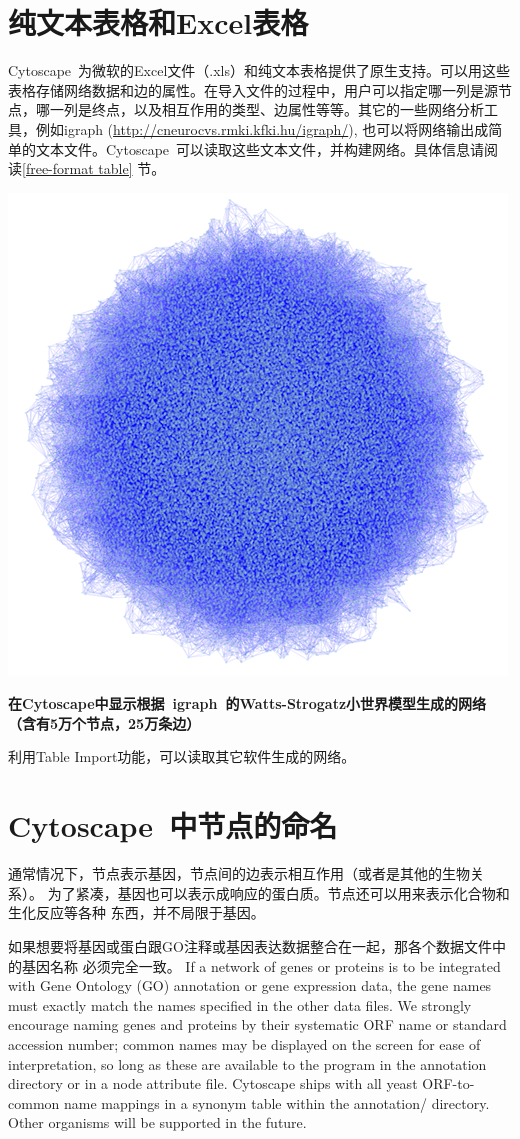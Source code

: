 \section{纯文本表格和Excel表格}

Cytoscape~为微软的Excel文件（.xls）和纯文本表格提供了原生支持。可以用这些表格存储网络数据和边的属性。在导入文件的过程中，用户可以指定哪一列是源节点，哪一列是终点，以及相互作用的类型、边属性等等。其它的一些网络分析工具，例如igraph (\url{http://cneurocvs.rmki.kfki.hu/igraph/}), 也可以将网络输出成简单的文本文件。Cytoscape~可以读取这些文本文件，并构建网络。具体信息请阅读\ref{free-format table} 节。

\centerline{\includegraphics[width=.7\textwidth]{images/huge_network_igraph.png}}

\textbf{在Cytoscape中显示根据~igraph~的Watts-Strogatz小世界模型生成的网络（含有5万个节点，25万条边）}
 
利用Table Import功能，可以读取其它软件生成的网络。
 
\section{Cytoscape~中节点的命名}

通常情况下，节点表示基因，节点间的边表示相互作用（或者是其他的生物关系）。
为了紧凑，基因也可以表示成响应的蛋白质。节点还可以用来表示化合物和生化反应等各种
东西，并不局限于基因。

如果想要将基因或蛋白跟GO注释或基因表达数据整合在一起，那各个数据文件中的基因名称
必须完全一致。
If a network of genes or proteins is to be integrated with Gene Ontology (GO)
annotation or gene expression data, the gene names must exactly match the names
specified in the other data files. We strongly encourage naming genes and
proteins by their systematic ORF name or standard accession number; common
names may be displayed on the screen for ease of interpretation, so long as
these are available to the program in the annotation directory or in a node
attribute file. Cytoscape ships with all yeast ORF-to-common name mappings in a
synonym table within the annotation/ directory. Other organisms will be
supported in the future. 

